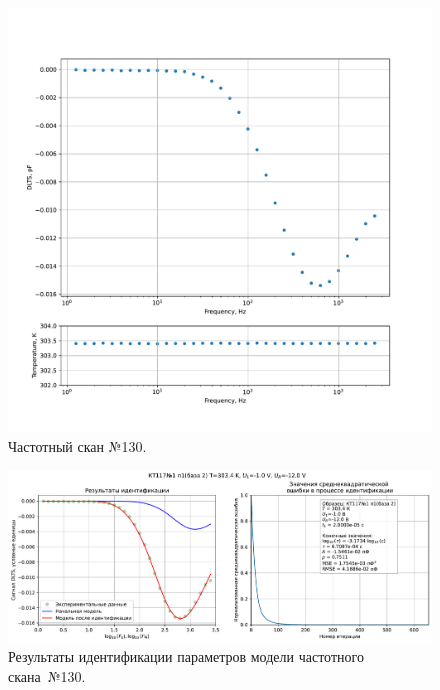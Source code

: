\begin{figure}[!ht]
    \centering
    \includegraphics[width=1\textwidth]{../plots/КТ117№1_п1(база 2)_2500Гц-1Гц_1пФ_+30С_-1В-12В_200мВ_20мкс_шаг_0,1.pdf}
    \caption{Частотный скан №130.}
    \label{pic:frequency_scan_130}
\end{figure}

\begin{figure}[!ht]
    \centering
    \includegraphics[width=1\textwidth]{../plots/КТ117№1_п1(база 2)_2500Гц-1Гц_1пФ_+30С_-1В-12В_200мВ_20мкс_шаг_0,1_model.pdf}
    \caption{Результаты идентификации параметров модели частотного скана~№130.}
    \label{pic:frequency_scan_model130}
\end{figure}

\pagebreak


